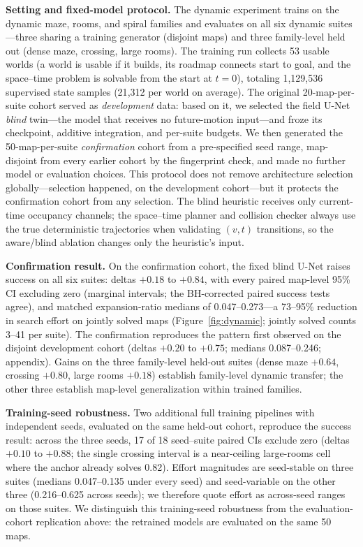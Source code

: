 \documentclass[letterpaper]{article} %
\begin{document}
\textbf{Setting and fixed-model protocol.} The dynamic experiment trains on the dynamic maze, rooms, and spiral families and evaluates on all six dynamic suites---three sharing a training generator (disjoint maps) and three family-level held out (dense maze, crossing, large rooms). The training run collects 53 usable worlds (a world is usable if it builds, its roadmap connects start to goal, and the space--time problem is solvable from the start at $t{=}0$), totaling 1{,}129{,}536 supervised state samples (21{,}312 per world on average). The original 20-map-per-suite cohort served as \emph{development} data: based on it, we selected the field U-Net \emph{blind} twin---the model that receives no future-motion input---and froze its checkpoint, additive integration, and per-suite budgets. We then generated the 50-map-per-suite \emph{confirmation} cohort from a pre-specified seed range, map-disjoint from every earlier cohort by the fingerprint check, and made no further model or evaluation choices. This protocol does not remove architecture selection globally---selection happened, on the development cohort---but it protects the confirmation cohort from any selection. The blind heuristic receives only current-time occupancy channels; the space--time planner and collision checker always use the true deterministic trajectories when validating $(v,t)$ transitions, so the aware/blind ablation changes only the heuristic's input.

\textbf{Confirmation result.} On the confirmation cohort, the fixed blind U-Net raises success on all six suites: deltas $+0.18$ to $+0.84$, with every paired map-level 95\% CI excluding zero (marginal intervals; the BH-corrected paired success tests agree), and matched expansion-ratio medians of 0.047--0.273---a 73--95\% reduction in search effort on jointly solved maps (Figure~\ref{fig:dynamic}; jointly solved counts 3--41 per suite). The confirmation reproduces the pattern first observed on the disjoint development cohort (deltas $+0.20$ to $+0.75$; medians 0.087--0.246; appendix). Gains on the three family-level held-out suites (dense maze $+0.64$, crossing $+0.80$, large rooms $+0.18$) establish family-level dynamic transfer; the other three establish map-level generalization within trained families.

\textbf{Training-seed robustness.} Two additional full training pipelines with independent seeds, evaluated on the same held-out cohort, reproduce the success result: across the three seeds, 17 of 18 seed--suite paired CIs exclude zero (deltas $+0.10$ to $+0.88$; the single crossing interval is a near-ceiling large-rooms cell where the anchor already solves 0.82). Effort magnitudes are seed-stable on three suites (medians 0.047--0.135 under every seed) and seed-variable on the other three (0.216--0.625 across seeds); we therefore quote effort as across-seed ranges on those suites. We distinguish this training-seed robustness from the evaluation-cohort replication above: the retrained models are evaluated on the same 50 maps.
\end{document}
